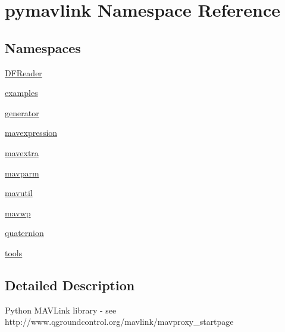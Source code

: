 \hypertarget{namespacepymavlink}{}\section{pymavlink Namespace Reference}
\label{namespacepymavlink}
\subsection*{Namespaces}
\begin{DoxyCompactItemize}
\item 
 \hyperlink{namespacepymavlink_1_1DFReader}{D\+F\+Reader}
\item 
 \hyperlink{namespacepymavlink_1_1examples}{examples}
\item 
 \hyperlink{namespacepymavlink_1_1generator}{generator}
\item 
 \hyperlink{namespacepymavlink_1_1mavexpression}{mavexpression}
\item 
 \hyperlink{namespacepymavlink_1_1mavextra}{mavextra}
\item 
 \hyperlink{namespacepymavlink_1_1mavparm}{mavparm}
\item 
 \hyperlink{namespacepymavlink_1_1mavutil}{mavutil}
\item 
 \hyperlink{namespacepymavlink_1_1mavwp}{mavwp}
\item 
 \hyperlink{namespacepymavlink_1_1quaternion}{quaternion}
\item 
 \hyperlink{namespacepymavlink_1_1tools}{tools}
\end{DoxyCompactItemize}


\subsection{Detailed Description}
\begin{DoxyVerb}Python MAVLink library - see http://www.qgroundcontrol.org/mavlink/mavproxy_startpage\end{DoxyVerb}
 